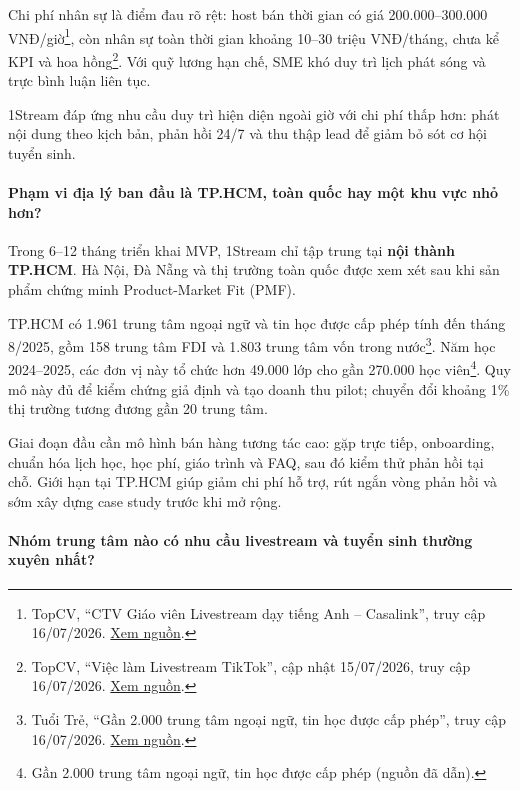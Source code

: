 Chi phí nhân sự là điểm đau rõ rệt: host bán thời gian có giá 200.000--300.000 VNĐ/giờ\footnote{TopCV, ``CTV Giáo viên Livestream dạy tiếng Anh -- Casalink'', truy cập 16/07/2026. \href{https://www.topcv.vn/viec-lam/cong-tac-vien-giao-vien-livestream-day-tieng-anh/2153769.html}{Xem nguồn}.}, còn nhân sự toàn thời gian khoảng 10--30 triệu VNĐ/tháng, chưa kể KPI và hoa hồng\footnote{TopCV, ``Việc làm Livestream TikTok'', cập nhật 15/07/2026, truy cập 16/07/2026. \href{https://www.topcv.vn/tim-viec-lam-livestream-tiktok}{Xem nguồn}.}. Với quỹ lương hạn chế, SME khó duy trì lịch phát sóng và trực bình luận liên tục.

1Stream đáp ứng nhu cầu duy trì hiện diện ngoài giờ với chi phí thấp hơn: phát nội dung theo kịch bản, phản hồi 24/7 và thu thập lead để giảm bỏ sót cơ hội tuyển sinh.

\paragraph{Phạm vi địa lý ban đầu là TP.HCM, toàn quốc hay một khu vực nhỏ hơn?}

Trong 6--12 tháng triển khai MVP, 1Stream chỉ tập trung tại \textbf{nội thành TP.HCM}. Hà Nội, Đà Nẵng và thị trường toàn quốc được xem xét sau khi sản phẩm chứng minh Product-Market Fit (PMF).

TP.HCM có 1.961 trung tâm ngoại ngữ và tin học được cấp phép tính đến tháng 8/2025, gồm 158 trung tâm FDI và 1.803 trung tâm vốn trong nước\footnote{Tuổi Trẻ, ``Gần 2.000 trung tâm ngoại ngữ, tin học được cấp phép'', truy cập 16/07/2026. \href{https://tuoitre.vn/plo/gan-2000-trung-tam-ngoai-ngu-tin-hoc-duoc-cap-phep-mot-so-noi-quang-cao-sai-su-that-post872241.html}{Xem nguồn}.}. Năm học 2024--2025, các đơn vị này tổ chức hơn 49.000 lớp cho gần 270.000 học viên\footnote{Gần 2.000 trung tâm ngoại ngữ, tin học được cấp phép (nguồn đã dẫn).}. Quy mô này đủ để kiểm chứng giả định và tạo doanh thu pilot; chuyển đổi khoảng 1\% thị trường tương đương gần 20 trung tâm.

Giai đoạn đầu cần mô hình bán hàng tương tác cao: gặp trực tiếp, onboarding, chuẩn hóa lịch học, học phí, giáo trình và FAQ, sau đó kiểm thử phản hồi tại chỗ. Giới hạn tại TP.HCM giúp giảm chi phí hỗ trợ, rút ngắn vòng phản hồi và sớm xây dựng case study trước khi mở rộng.

\paragraph{Nhóm trung tâm nào có nhu cầu livestream và tuyển sinh thường xuyên nhất?}

